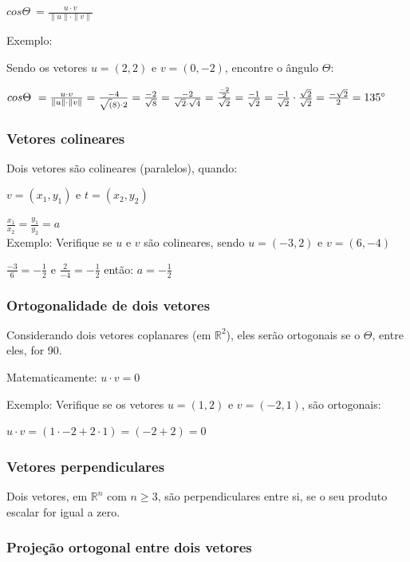 \documentclass[12pt]{article}
\begin{document}
\(cos \Theta\ = \frac{u  \cdot  v}{\|u\| \cdot \|v\|}\)

Exemplo:

Sendo os vetores \(u = (2,2)\) e \(v=(0, -2)\), encontre o ângulo $\Theta$:

\(cos \Theta\ = \frac{u  \cdot  v}{\|u\| \cdot \|v\|} = \frac{-4}{\sqrt(8) \cdot 2} = \frac{-2}{\sqrt{8}}=\frac{-2}{\sqrt{2} \cdot \sqrt{4}}=\frac{\frac{-2}{2}}{\sqrt{2}} = \frac{-1}{\sqrt{2}} = \frac{-1}{\sqrt{2}}  \cdot  \frac{\sqrt{2}}{\sqrt{2}} = \frac{-\sqrt{2}}{2} = 135\degree\)

\subsubsection{Vetores colineares}

Dois vetores são colineares (paralelos), quando:

\(v = (x_{1}, y_{1})\) e \(t = (x_{2}, y_{2})\)

\(\frac{x_{1}}{x_{2}} = \frac{y_{1}}{y_{2}} = a\)
\\

Exemplo: Verifique se \(u\) e \(v\) são colineares, sendo \(u = (-3, 2)\) e \(v=(6,-4)\)

\(\frac{-3}{6} = -\frac{1}{2}\) e \(\frac{2}{-4} = -\frac{1}{2}\) então: \(a = -\frac{1}{2}\)

\subsubsection{Ortogonalidade de dois vetores}

Considerando dois vetores coplanares (em \(\mathbb{R}^2\)), eles serão ortogonais se o $\Theta$, entre eles, for 90\degree.

Matematicamente: \(u  \cdot  v = 0\)

Exemplo: Verifique se os vetores \(u = (1, 2)\) e \(v = (-2, 1)\), são ortogonais:

\(u  \cdot  v = (1  \cdot  -2 + 2  \cdot  1) = (-2 + 2) = 0\)


\subsubsection{Vetores perpendiculares}

Dois vetores, em \(\mathbb{R}^n\) com \(n \geq 3\), são perpendiculares entre si, se o seu produto escalar for igual a zero.

\subsubsection{Projeção ortogonal entre dois vetores}
\end{document}
